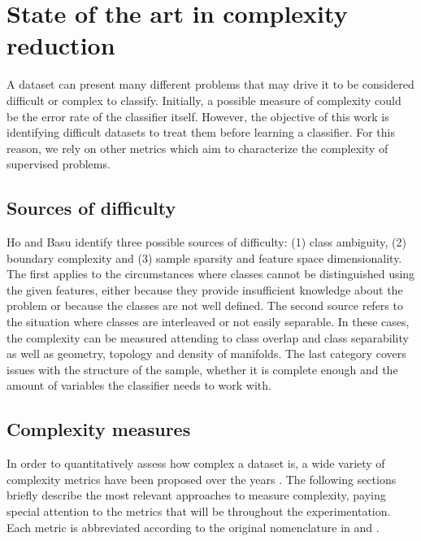 \section{State of the art in complexity reduction}\label{p6sec.sota}

A dataset can present many different problems that may drive it to be considered difficult or complex to classify. Initially, a possible measure of complexity could be the error rate of the classifier itself. However, the objective of this work is identifying difficult datasets to treat them before learning a classifier. For this reason, we rely on other metrics which aim to characterize the complexity of supervised problems.

\subsection{Sources of difficulty}

Ho and Basu \cite{basubook} identify three possible sources of difficulty: (1) class ambiguity, (2) boundary complexity and (3) sample sparsity and feature space dimensionality. The first applies to the circumstances where classes cannot be distinguished using the given features, either because they provide insufficient knowledge about the problem or because the classes are not well defined. The second source refers to the situation where classes are interleaved or not easily separable. In these cases, the complexity can be measured attending to class overlap and class separability as well as geometry, topology and density of manifolds. The last category covers issues with the structure of the sample, whether it is complete enough and the amount of variables the classifier needs to work with.


\subsection{Complexity measures}\label{p6sec.compmeas}

In order to quantitatively assess how complex a dataset is, a wide variety of complexity metrics have been proposed over the years \cite{ho2000measuring,lorena2019complex}. The following sections briefly describe the most relevant approaches to measure complexity, paying special attention to the metrics that will be  throughout the experimentation. Each metric is abbreviated according to the original nomenclature in \cite{ho2000measuring} and \cite{lorena2019complex}.

